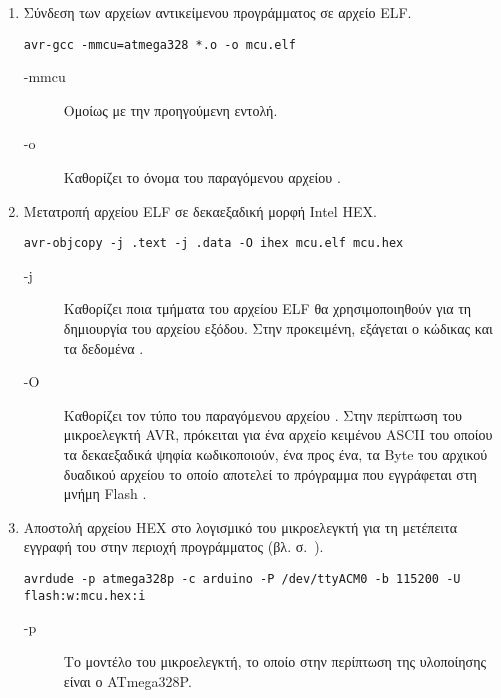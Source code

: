 \begin{enumerate}
    \item Σύνδεση των αρχείων αντικείμενου προγράμματος σε αρχείο ELF.
\begin{lstlisting}
avr-gcc -mmcu=atmega328 *.o -o mcu.elf
\end{lstlisting}

    \begin{description}
        \item[-mmcu] Ομοίως με την προηγούμενη εντολή.

        \item[-o] Καθορίζει το όνομα του παραγόμενου αρχείου
        \parencite{gcc:options}.
    \end{description}


    \item Μετατροπή αρχείου ELF σε δεκαεξαδική μορφή Intel HEX.
\begin{lstlisting}
avr-objcopy -j .text -j .data -O ihex mcu.elf mcu.hex
\end{lstlisting}

    \begin{description}
        \item[-j] Καθορίζει ποια τμήματα του αρχείου ELF θα χρησιμοποιηθούν για
        τη δημιουργία του αρχείου εξόδου. Στην προκειμένη, εξάγεται ο κώδικας
        και τα δεδομένα \parencite[346]{avrlibc}.

        \item[-O] Καθορίζει τον τύπο του παραγόμενου αρχείου
        \parencite[346]{avrlibc}. Στην περίπτωση του μικροελεγκτή AVR, πρόκειται
        για ένα αρχείο κειμένου ASCII του οποίου τα δεκαεξαδικά ψηφία
        κωδικοποιούν, ένα προς ένα, τα Byte του αρχικού δυαδικού αρχείου το
        οποίο αποτελεί το πρόγραμμα που εγγράφεται στη μνήμη Flash
        \parencites[4]{intel88}[10]{atmel12programmer}.
    \end{description}


    \item Αποστολή αρχείου HEX στο λογισμικό  του μικροελεγκτή
    για τη μετέπειτα εγγραφή του στην περιοχή προγράμματος (βλ.
     σ.~\pageref{subsec:avr:progmem}).
\begin{lstlisting}
avrdude -p atmega328p -c arduino -P /dev/ttyACM0 -b 115200 -U flash:w:mcu.hex:i
\end{lstlisting}
    \begin{description}
        \item[-p] Το μοντέλο του μικροελεγκτή, το οποίο στην περίπτωση της
        υλοποίησης είναι ο ATmega328P.


\end{description}
\end{enumerate}
